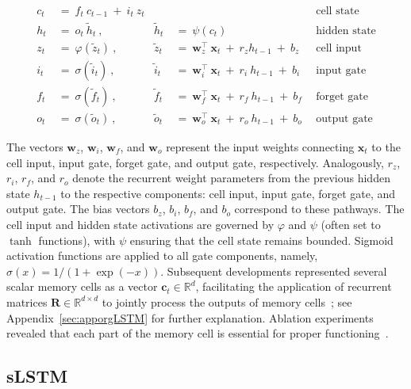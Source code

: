 \begin{align}
c_t \ &= \  f_t \ c_{t-1} \ + \ i_t \ z_t &  & &\text{cell state} \\
h_t  \ &= \ o_t \ \tilde{h}_t \ , & \tilde{h}_t \ &= \ \psi \left( c_t\right)
  &\text{hidden state} \\
z_t \ &= \ \varphi \left( \tilde{z}_t \right) \ , 
  &\tilde{z}_t \ &=  \ \mathbf{w}^\top_{z} \ \mathbf{x}_t \ + \
  r_{z}  h_{t-1} \ + \  b_{z} \ \
  &\text{cell input} \\
i_t \ &= \ \sigma \left( \tilde{i}_t  \right) \ , 
  &\tilde{i}_t \ &= \ \mathbf{w}^\top_{i} \ \mathbf{x}_t \ + \
  r_{i}  \ h_{t-1} \ + \  b_{i} \ \
  &\text{input gate} \\
f_t \ &= \ \sigma \left(  \tilde{f}_t \right) \ , 
  &\tilde{f}_t \ &= \ \mathbf{w}^\top_{f} \ \mathbf{x}_t  \ + \
  r_{f}  \ h_{t-1} \ + \  b_{f} \ \
  &\text{forget gate} \\
o_t \ &= \ \sigma \left( \tilde{o}_t \right) \ , 
  &\tilde{o}_t  \ &= \ \mathbf{w}^\top_{o} \ \mathbf{x}_t \ + \
  r_{o}  \ h_{t-1} \ + \  b_{o} \ \
  &\text{output gate} 
\end{align}

The vectors $\mathbf{w}_{z}$, $\mathbf{w}_{i}$, $\mathbf{w}_{f}$, and $\mathbf{w}_{o}$ represent the input weights connecting $\mathbf{x}_t$ to the cell input, input gate, forget gate, and output gate, respectively. Analogously, $r_{z}$, $r_{i}$, $r_{f}$, and $r_{o}$ denote the recurrent weight parameters from the previous hidden state $h_{t-1}$ to the respective components: cell input, input gate, forget gate, and output gate. The bias vectors $b_{z}$, $b_{i}$, $b_{f}$, and $b_{o}$ correspond to these pathways. The cell input and hidden state activations are governed by $\varphi$ and $\psi$ (often set to $\tanh$ functions), with $\psi$ ensuring that the cell state remains bounded. Sigmoid activation functions are applied to all gate components, namely, $\sigma \left( x \right)= 1/(1+\exp(-x))$. Subsequent developments represented several scalar memory cells as a vector $\mathbf{c}_t \in \mathbb{R}^{d}$, facilitating the application of recurrent matrices $\mathbf{R} \in \mathbb{R}^{d \times d}$ to jointly process the outputs of memory cells~\citep{Greff:15}; see Appendix~\ref{sec:apporgLSTM} for further explanation. Ablation experiments revealed that each part of the memory cell is essential for proper functioning~\citep{Greff:15}.

\subsection{sLSTM}
\label{sec:sLSTM}

